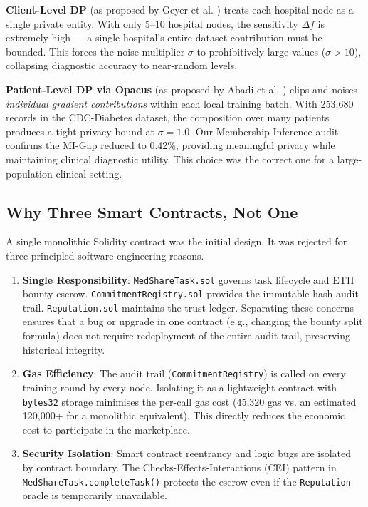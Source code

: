 \documentclass[10pt, a4paper, twocolumn]{article}
\begin{document}
\textbf{Client-Level DP} (as proposed by Geyer et al. \cite{geyer2017}) treats each hospital node as a single private entity. With only 5--10 hospital nodes, the sensitivity $\Delta f$ is extremely high --- a single hospital's entire dataset contribution must be bounded. This forces the noise multiplier $\sigma$ to prohibitively large values ($\sigma > 10$), collapsing diagnostic accuracy to near-random levels.

\textbf{Patient-Level DP via Opacus} (as proposed by Abadi et al. \cite{abadi2016}) clips and noises \textit{individual gradient contributions} within each local training batch. With 253,680 records in the CDC-Diabetes dataset, the composition over many patients produces a tight privacy bound at $\sigma = 1.0$. Our Membership Inference audit confirms the MI-Gap reduced to 0.42\%, providing meaningful privacy while maintaining clinical diagnostic utility. This choice was the correct one for a large-population clinical setting.

\subsection{Why Three Smart Contracts, Not One}
A single monolithic Solidity contract was the initial design. It was rejected for three principled software engineering reasons.

\begin{enumerate}
    \item \textbf{Single Responsibility}: \texttt{MedShareTask.sol} governs task lifecycle and ETH bounty escrow. \texttt{CommitmentRegistry.sol} provides the immutable hash audit trail. \texttt{Reputation.sol} maintains the trust ledger. Separating these concerns ensures that a bug or upgrade in one contract (e.g., changing the bounty split formula) does not require redeployment of the entire audit trail, preserving historical integrity.
    \item \textbf{Gas Efficiency}: The audit trail (\texttt{CommitmentRegistry}) is called on every training round by every node. Isolating it as a lightweight contract with \texttt{bytes32} storage minimises the per-call gas cost (45,320 gas vs. an estimated 120,000+ for a monolithic equivalent). This directly reduces the economic cost to participate in the marketplace.
    \item \textbf{Security Isolation}: Smart contract reentrancy and logic bugs are isolated by contract boundary. The Checks-Effects-Interactions (CEI) pattern in \texttt{MedShareTask.completeTask()} protects the escrow even if the \texttt{Reputation} oracle is temporarily unavailable.
\end{enumerate}
\end{document}
